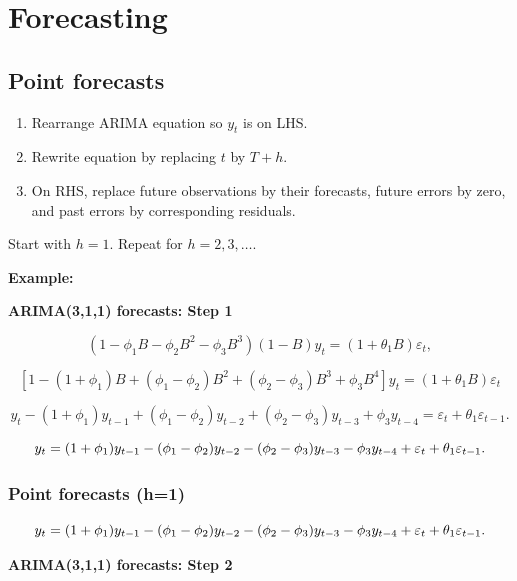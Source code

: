 \documentclass[]{book}
\providecommand{\tightlist}{%
  \setlength{\itemsep}{0pt}\setlength{\parskip}{0pt}}
\begin{document}
\hypertarget{forecasting}{%
\section{Forecasting}\label{forecasting}}

\hypertarget{point-forecasts}{%
\subsection{Point forecasts}\label{point-forecasts}}

\begin{enumerate}
\def\labelenumi{\arabic{enumi}.}
\tightlist
\item
  Rearrange ARIMA equation so \(y_t\) is on LHS.
\item
  Rewrite equation by replacing \(t\) by \(T+h\).
\item
  On RHS, replace future observations by their forecasts, future errors by zero, and past errors by corresponding residuals.
\end{enumerate}

Start with \(h=1\). Repeat for \(h=2,3,\dots\).

\textbf{Example:}

\textbf{ARIMA(3,1,1) forecasts: Step 1}

\[(1-\phi_1B -\phi_2B^2-\phi_3B^3)(1-B) y_t = (1+\theta_1B)\varepsilon_{t},\]

\[[1-(1+\phi_1)B +(\phi_1-\phi_2)B^2 + (\phi_2-\phi_3)B^3 +\phi_3B^4] y_t = (1+\theta_1B)\varepsilon_{t}\]

\[y_t - (1+\phi_1)y_{t-1} +(\phi_1-\phi_2)y_{t-2} + (\phi_2-\phi_3)y_{t-3} \mbox{}+\phi_3y_{t-4} = \varepsilon_t+\theta_1\varepsilon_{t-1}.\]

\[y_t = (1+\phi_1)y_{t-1} -(\phi_1-\phi_2)y_{t-2} - (\phi_2-\phi_3)y_{t-3}\\\mbox{} -\phi_3y_{t-4} + \varepsilon_t+\theta_1\varepsilon_{t-1}.\]

\hypertarget{point-forecasts-h1}{%
\subsubsection{Point forecasts (h=1)}\label{point-forecasts-h1}}

\[y_t = (1+\phi_1)y_{t-1} -(\phi_1-\phi_2)y_{t-2} - (\phi_2-\phi_3)y_{t-3}\\\mbox{} -\phi_3y_{t-4} + \varepsilon_t+\theta_1\varepsilon_{t-1}.\]

\textbf{ARIMA(3,1,1) forecasts: Step 2}
\end{document}
